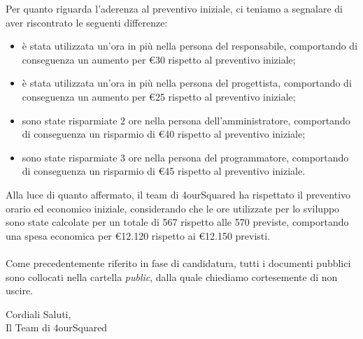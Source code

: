 \documentclass[12pt, a4paper]{article}
\begin{document}
Per quanto riguarda l'aderenza al preventivo iniziale, ci teniamo a segnalare di aver riscontrato le seguenti differenze:
\begin{itemize}
    \item è stata utilizzata un'ora in più nella persona del responsabile, comportando di conseguenza un aumento per €30 rispetto al preventivo iniziale;
    \item è stata utilizzata un'ora in più nella persona del progettista, comportando di conseguenza un aumento per €25 rispetto al preventivo iniziale;
    \item sono state risparmiate 2 ore nella persona dell'amministratore, comportando di conseguenza un risparmio di €40 rispetto al preventivo iniziale;
    \item sono state risparmiate 3 ore nella persona del programmatore, comportando di conseguenza un risparmio di €45 rispetto al preventivo iniziale.
\end{itemize}

Alla luce di quanto affermato, il team di 4ourSquared ha rispettato il preventivo orario ed economico iniziale, considerando che le ore utilizzate per lo sviluppo sono state calcolate per un totale di 567 rispetto alle 570 previste, comportando una spesa economica per €12.120 rispetto ai €12.150 previsti.\\\\

Come precedentemente riferito in fase di candidatura, tutti i documenti pubblici sono collocati nella cartella \textit{public}, dalla quale chiediamo cortesemente di non uscire.

\begin{flushright}
    Cordiali Saluti,\\
    Il Team di 4ourSquared
    \end{flushright}
\end{document}

